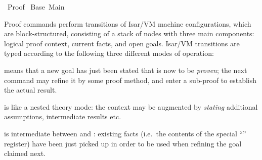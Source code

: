 %
\begin{isabellebody}%
\def\isabellecontext{Proof}%
%
\isadelimtheory
%
\endisadelimtheory
%
\isatagtheory
{}\isamarkupfalse%
\ Proof\isanewline
{}\ Base\ Main\isanewline
{}%
\endisatagtheory
{\isafoldtheory}%
%
\isadelimtheory
%
\endisadelimtheory
%
\isamarkuptrue%
%
\begin{isamarkuptext}%
Proof commands perform transitions of Isar/VM machine
  configurations, which are block-structured, consisting of a stack of
  nodes with three main components: logical proof context, current
  facts, and open goals.  Isar/VM transitions are typed according to
  the following three different modes of operation:

  \begin{description}

  \item {} means that a new goal has just been
  stated that is now to be \emph{proven}; the next command may refine
  it by some proof method, and enter a sub-proof to establish the
  actual result.

  \item {} is like a nested theory mode: the
  context may be augmented by \emph{stating} additional assumptions,
  intermediate results etc.

  \item {} is intermediate between  and : existing facts (i.e.\
  the contents of the special ``\hyperlink{fact.this}{\mbox{}}'' register) have been
  just picked up in order to be used when refining the goal claimed
  next.

  \end{description}


\end{isamarkuptext}
\end{isabellebody}

